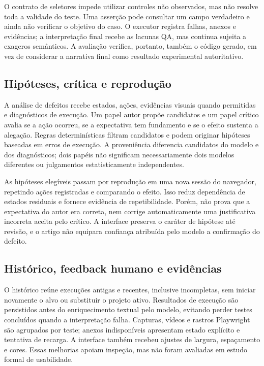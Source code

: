 \documentclass[12pt]{article}
\begin{document}
O contrato de seletores impede utilizar controles não observados, mas não resolve toda a validade do teste. Uma asserção pode consultar um campo verdadeiro e ainda não verificar o objetivo do caso. O executor registra falhas, anexos e evidências; a interpretação final recebe as lacunas QA, mas continua sujeita a exageros semânticos. A avaliação verifica, portanto, também o código gerado, em vez de considerar a narrativa final como resultado experimental autoritativo.

\subsection{Hipóteses, crítica e reprodução}
A análise de defeitos recebe estados, ações, evidências visuais quando permitidas e diagnósticos de execução. Um papel autor propõe candidatos e um papel crítico avalia se a ação ocorreu, se a expectativa tem fundamento e se o efeito sustenta a alegação. Regras determinísticas filtram candidatos e podem originar hipóteses baseadas em erros de execução. A proveniência diferencia candidatos do modelo e dos diagnósticos; dois papéis não significam necessariamente dois modelos diferentes ou julgamentos estatisticamente independentes.

As hipóteses elegíveis passam por reprodução em uma nova sessão do navegador, repetindo ações registradas e comparando o efeito. Isso reduz dependência de estados residuais e fornece evidência de repetibilidade. Porém, não prova que a expectativa do autor era correta, nem corrige automaticamente uma justificativa incorreta aceita pelo crítico. A interface preserva o caráter de hipótese até revisão, e o artigo não equipara confiança atribuída pelo modelo a confirmação do defeito.

\subsection{Histórico, feedback humano e evidências}
O histórico reúne execuções antigas e recentes, inclusive incompletas, sem iniciar novamente o alvo ou substituir o projeto ativo. Resultados de execução são persistidos antes do enriquecimento textual pelo modelo, evitando perder testes concluídos quando a interpretação falha. Capturas, vídeos e rastros Playwright são agrupados por teste; anexos indisponíveis apresentam estado explícito e tentativa de recarga. A interface também recebeu ajustes de largura, espaçamento e cores. Essas melhorias apoiam inspeção, mas não foram avaliadas em estudo formal de usabilidade.
\end{document}
